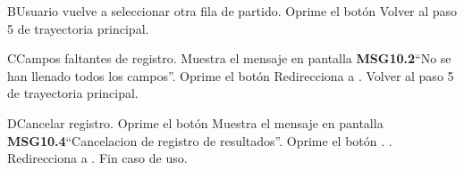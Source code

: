 	\begin{UCtrayectoriaA}{B}{Usuario vuelve a seleccionar otra fila de partido.}
		\UCpaso[\UCactor] Oprime el botón 
		\UCpaso[] Volver al paso 5 de trayectoria principal.
	\end{UCtrayectoriaA}	
	
	\begin{UCtrayectoriaA}{C}{Campos faltantes de registro.}
		\UCpaso Muestra el mensaje en pantalla {\bf MSG10.2}``No se han llenado todos los campos''.
		\UCpaso[\UCactor] Oprime el botón 
		\UCpaso Redirecciona a .
		\UCpaso[] Volver al paso 5 de trayectoria principal.
	\end{UCtrayectoriaA}
	
	\begin{UCtrayectoriaA}{D}{Cancelar registro.}
		\UCpaso[\UCactor] Oprime el botón 
		\UCpaso Muestra el mensaje en pantalla {\bf MSG10.4}``Cancelacion de registro de resultados''.
		\UCpaso[\UCactor] Oprime el botón . .
		\UCpaso Redirecciona a .
		\UCpaso[] Fin caso de uso.
	\end{UCtrayectoriaA}
